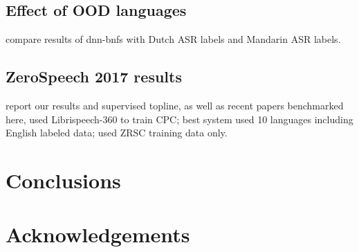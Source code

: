 \documentclass[a4paper]{article}
\begin{document}
\subsection{Effect of OOD languages}
compare results of dnn-bnfs with Dutch ASR labels and Mandarin ASR labels.
\subsection{ZeroSpeech 2017 results}
report our results and supervised topline, as well as recent papers benchmarked here, \cite{riviere2020unsupervised} used Librispeech-360 to train CPC; \cite{shibata2017composite} best system used 10 languages including English labeled data; \cite{chorowski2019unsupervised} used ZRSC training data only.

\section{Conclusions}


\section{Acknowledgements}








\end{document}
